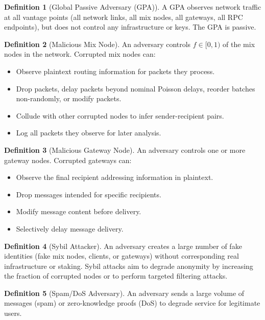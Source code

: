 \documentclass[11pt]{article}
\theoremstyle{definition}
\newtheorem{definition}{Definition}
\theoremstyle{remark}
\begin{document}
\begin{definition}[Global Passive Adversary (GPA)]
A GPA observes network traffic at all vantage points (all network links, all mix nodes, all gateways, all RPC endpoints), but does not control any infrastructure or keys. The GPA is passive.
\end{definition}

\begin{definition}[Malicious Mix Node]
An adversary controls $f \in [0,1)$ of the mix nodes in the network. Corrupted mix nodes can:
\begin{itemize}
    \item Observe plaintext routing information for packets they process.
    \item Drop packets, delay packets beyond nominal Poisson delays, reorder batches non-randomly, or modify packets.
    \item Collude with other corrupted nodes to infer sender-recipient pairs.
    \item Log all packets they observe for later analysis.
\end{itemize}
\end{definition}

\begin{definition}[Malicious Gateway Node]
An adversary controls one or more gateway nodes. Corrupted gateways can:
\begin{itemize}
    \item Observe the final recipient addressing information in plaintext.
    \item Drop messages intended for specific recipients.
    \item Modify message content before delivery.
    \item Selectively delay message delivery.
\end{itemize}
\end{definition}

\begin{definition}[Sybil Attacker]
An adversary creates a large number of fake identities (fake mix nodes, clients, or gateways) without corresponding real infrastructure or staking. Sybil attacks aim to degrade anonymity by increasing the fraction of corrupted nodes or to perform targeted filtering attacks.
\end{definition}

\begin{definition}[Spam/DoS Adversary]
An adversary sends a large volume of messages (spam) or zero-knowledge proofs (DoS) to degrade service for legitimate users.
\end{definition}
\end{document}
